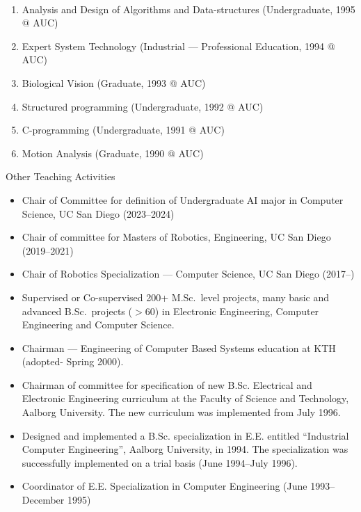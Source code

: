 \documentclass{article}
\begin{document}
\begin{cv}
\begin{cvlist}{~}
\begin{enumerate}
  \item Analysis and Design of Algorithms and Data-structures
    (Undergraduate, 1995 @ AUC)
  \item Expert System Technology (Industrial --- Professional Education,
    1994 @ AUC)
  \item Biological Vision (Graduate, 1993 @ AUC)
  \item Structured programming (Undergraduate, 1992 @ AUC)
  \item C-programming (Undergraduate, 1991 @ AUC)
  \item Motion Analysis (Graduate, 1990 @ AUC)
 \end{enumerate}

\item[Other Teaching Activities]
\begin{itemize}
  \item Chair of Committee for definition of Undergraduate AI major in Computer
        Science, UC San Diego (2023--2024)
        
  \item Chair of committee for Masters of Robotics, Engineering, 
    UC San Diego (2019--2021)

  \item Chair of Robotics Specialization --- Computer Science, UC San
    Diego (2017--)

  \item Supervised or Co-supervised 200+ M.Sc.\ level projects,
    many basic and advanced B.Sc.\ projects ($>$60) in Electronic
    Engineering, Computer Engineering and Computer Science.

  \item Chairman --- Engineering of Computer Based Systems education at
    KTH (adopted- Spring 2000).

  \item Chairman of committee for specification of new B.Sc. Electrical
    and Electronic Engineering curriculum at the Faculty of Science and
    Technology, Aalborg University.  The new curriculum was implemented
    from July 1996.

  \item Designed and implemented a B.Sc. specialization in E.E.
    entitled ``Industrial Computer Engineering'', Aalborg University, in
    1994.  The specialization was successfully implemented on a trial
    basis (June 1994--July 1996).

  \item Coordinator of E.E. Specialization in Computer Engineering (June
    1993--December 1995)
\end{itemize}
\end{cvlist}


\end{cv}
\end{document}
